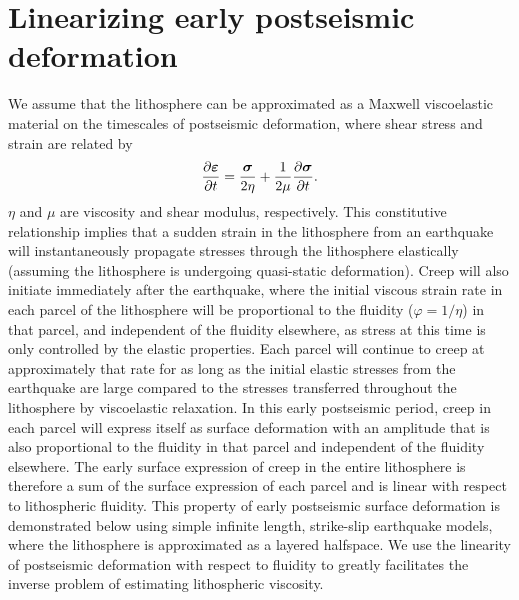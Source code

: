 \documentclass[extra]{gji}
\begin{document}
\section{Linearizing early postseismic deformation} 
We assume that the lithosphere can be approximated as a Maxwell
viscoelastic material on the timescales of postseismic deformation,
where shear stress and strain are related by
\begin{equation}
  \frac{\partial\mitbf{\varepsilon}}{\partial t}=\frac{\mitbf{\sigma}}{2\eta} + 
                              \frac{1}{2\mu}\frac{\partial\mitbf{\sigma}}{\partial t}.
\end{equation}
$\eta$ and $\mu$ are viscosity and shear modulus, respectively.  This
constitutive relationship implies that a sudden strain in the
lithosphere from an earthquake will instantaneously propagate stresses
through the lithosphere elastically (assuming the lithosphere is
undergoing quasi-static deformation).  Creep will also initiate
immediately after the earthquake, where the initial viscous strain
rate in each parcel of the lithosphere will be proportional to the
fluidity ($\varphi=1/\eta$) in that parcel, and independent of the
fluidity elsewhere, as stress at this time is only controlled by the
elastic properties.  Each parcel will continue to creep at
approximately that rate for as long as the initial elastic stresses
from the earthquake are large compared to the stresses transferred
throughout the lithosphere by viscoelastic relaxation.  In this early
postseismic period, creep in each parcel will express itself as
surface deformation with an amplitude that is also proportional to the
fluidity in that parcel and independent of the fluidity elsewhere.
The early surface expression of creep in the entire lithosphere is
therefore a sum of the surface expression of each parcel and is linear
with respect to lithospheric fluidity.  This property of early
postseismic surface deformation is demonstrated below using simple
infinite length, strike-slip earthquake models, where the lithosphere
is approximated as a layered halfspace.  We use the linearity of
postseismic deformation with respect to fluidity to greatly
facilitates the inverse problem of estimating lithospheric viscosity.
\end{document}
